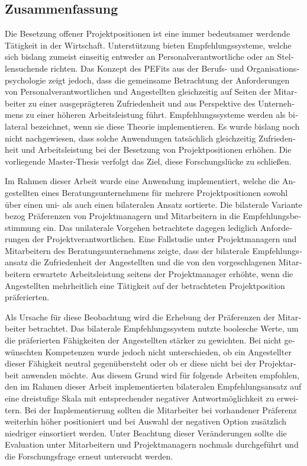 \begin{otherlanguage}{ngerman}
\chapter*{Zusammenfassung}
Die Besetzung offener Projektpositionen ist eine immer bedeutsamer werdende Tätigkeit in der Wirtschaft. Unterstützung bieten Empfehlungssysteme, welche sich bislang zumeist einseitig entweder an Personalverantwortliche oder an Stellensuchende richten. Das Konzept des \aclp{PEFit} aus der Berufs- und Organisationspsychologie zeigt jedoch, dass die gemeinsame Betrachtung der Anforderungen von Personalverantwortlichen und Angestellten gleichzeitig auf Seiten der Mitarbeiter zu einer ausgeprägteren Zufriedenheit und aus Perspektive des Unternehmens zu einer höheren Arbeitsleistung führt. Empfehlungssysteme werden als bilateral bezeichnet, wenn sie diese Theorie implementieren. Es wurde bislang noch nicht nachgewiesen, dass solche Anwendungen tatsächlich gleichzeitig Zufriedenheit und Arbeitsleistung bei der Besetzung von Projektpositionen erhöhen. Die vorliegende Master-Thesis verfolgt das Ziel, diese Forschungslücke zu schließen.

Im Rahmen dieser Arbeit wurde eine Anwendung implementiert, welche die Angestellten eines Beratungsunternehmens für mehrere Projektpositionen sowohl über einen uni- als auch einen bilateralen Ansatz sortierte. Die bilaterale Variante bezog Präferenzen von Projektmanagern und Mitarbeitern in die Empfehlungsbestimmung ein. Das unilaterale Vorgehen betrachtete dagegen lediglich Anforderungen der Projektverantwortlichen. Eine Fallstudie unter Projektmanagern und Mitarbeitern des Beratungsunternehmens zeigte, dass der bilaterale Empfehlungsansatz die Zufriedenheit der Angestellten und die von den vorgeschlagenen Mitarbeitern erwartete Arbeitsleistung seitens der Projektmanager erhöhte, wenn die Angestellten mehrheitlich eine Tätigkeit auf der betrachteten Projektposition präferierten.

Als Ursache für diese Beobachtung wird die Erhebung der Präferenzen der Mitarbeiter betrachtet. Das bilaterale Empfehlungssystem nutzte boolesche Werte, um die präferierten Fähigkeiten der Angestellten stärker zu gewichten. Bei nicht gewünschten Kompetenzen wurde jedoch nicht unterschieden, ob ein Angestellter dieser Fähigkeit neutral gegenübersteht oder ob er diese nicht bei der Projektarbeit anwenden möchte. Aus diesem Grund wird für folgende Arbeiten empfohlen, den im Rahmen dieser Arbeit implementierten bilateralen Empfehlungsansatz auf eine dreistufige Skala mit entsprechender negativer Antwortmöglichkeit zu erweitern. Bei der Implementierung sollten die Mitarbeiter bei vorhandener Präferenz weiterhin höher positioniert und bei Auswahl der negativen Option zusätzlich niedriger einsortiert werden. Unter Beachtung dieser Veränderungen sollte die Evaluation unter Mitarbeitern und Projektmanagern nochmals durchgeführt und die Forschungsfrage erneut untersucht werden.
\end{otherlanguage}
